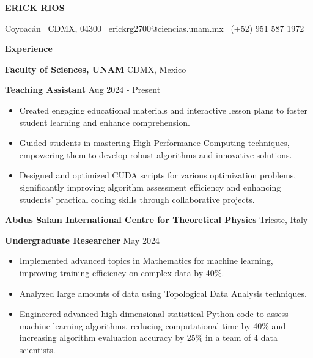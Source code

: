 \documentclass[6pt]{article}
\begin{document}
\begin{center}
    \textbf{ERICK RIOS}\\ 
    \hrulefill
\end{center}

\begin{center}
    Coyoacán \textbullet \ CDMX, 04300 \textbullet \ erickrg2700@ciencias.unam.mx \textbullet \ (+52) 951 587 1972
\end{center}

\vspace{0.5pt}

\begin{center}
    \textbf{Experience}
\end{center}
\textbf{Faculty of Sciences, UNAM} \hfill CDMX, Mexico

\textbf{Teaching Assistant} \hfill Aug 2024 - Present
\begin{itemize}[noitemsep, topsep=0pt, partopsep=0pt, parsep=0pt]
    \item Created engaging educational materials and interactive lesson plans to foster student learning and enhance comprehension.
    \item Guided students in mastering High Performance Computing techniques, empowering them to develop robust algorithms and innovative solutions.
    \item Designed and optimized CUDA scripts for various optimization problems, significantly improving algorithm assessment efficiency and enhancing students' practical coding skills through collaborative projects.
\end{itemize}

\vspace{12pt}
\textbf{Abdus Salam International Centre for Theoretical Physics} \hfill Trieste, Italy

\textbf{Undergraduate Researcher} \hfill May 2024
\begin{itemize}[noitemsep, topsep=0pt, partopsep=0pt, parsep=0pt]
    \item Implemented advanced topics in Mathematics for machine learning, improving training efficiency on complex data by 40\%.
    \item Analyzed large amounts of data using Topological Data Analysis techniques.
    \item Engineered advanced high-dimensional statistical Python code to assess machine learning algorithms, reducing computational time by 40\% and increasing algorithm evaluation accuracy by 25\% in a team of 4 data scientists.
\end{itemize}
\end{document}
